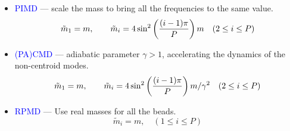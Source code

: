 \begin{frame}
  \begin{itemize}
  \item \textcolor{blue}{{PIMD}} --- scale the mass to bring all the frequencies
    to the same value.
    \begin{equation*}
      \tilde{m}_1 = m, \qquad \tilde{m}_i = 4\sin^2\left({(i-1)\pi\over
          P}\right) m \quad (2 \le i \le P)
    \end{equation*}
  \item \textcolor{blue}{{(PA)CMD}} --- adiabatic parameter $\gamma > 1$, accelerating the dynamics of the non-centroid modes.
    \begin{equation*}
      \tilde{m}_1 = m, \qquad \tilde{m}_i = 4\sin^2\left({(i-1)\pi\over
          P}\right) m / \gamma^2 \quad (2 \le i \le P)
    \end{equation*}
  \item \textcolor{blue}{{RPMD}} --- Use real masses for all the beads.
    \begin{equation*}
      \tilde{m}_i = m, \quad (1 \le i \le P)
    \end{equation*}
  \end{itemize}
\end{frame}

